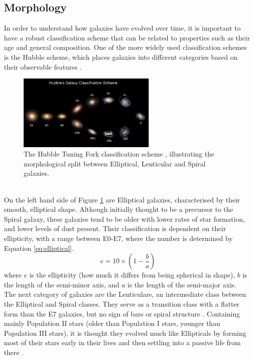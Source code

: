 \documentclass[12pt, onecolumn]{aa}
\begin{document}
\subsection{Morphology}\label{sec:morph}
In order to understand how galaxies have evolved over time, it is important to have a robust classification scheme that can be related to properties such as their age and general composition. One of the more widely used classification schemes is the Hubble scheme, which places galaxies into different categories based on their observable features \citep{1926ApJ....64..321H}. 
\begin{figure}
    \centering
    \includegraphics[width=0.6\textwidth]{Figures/HubbleTuningFork2w.jpg}
    \caption{The Hubble Tuning Fork classification scheme \citep{hubblegzdiagram}, illustrating the morphological split between Elliptical, Lenticular and Spiral galaxies.}
    \label{fig:htuningdiagram}
\end{figure}\\

On the left hand side of Figure \ref{fig:htuningdiagram} are Elliptical galaxies, characterised by their smooth, elliptical shape. Although initially thought to be a precursor to the Spiral galaxy, these galaxies tend to be older \citep{SANDAGEMountWilson} with lower rates of star formation, and lower levels of dust present. Their classification is dependent on their ellipticity, with a range between E0-E7, where the number is determined by Equation \ref{eq:elliptical}.
\begin{equation}
    e = 10 \times (1 - \frac{b}{a})
    \label{eq:elliptical}
\end{equation}
where $e$ is the ellipticity (how much it differs from being spherical in shape), $b$ is the length of the semi-minor axis, and $a$ is the length of the semi-major axis.\\

The next category of galaxies are the Lenticulars, an intermediate class between the Elliptical and Spiral classes. They serve as a transition class with a flatter form than the E7 galaxies, but no sign of bars or spiral structure \citep{SANDAGEMountWilson}. Containing mainly Population II stars (older than Population I stars, younger than Population III stars), it is thought they evolved much like Ellipticals by forming most of their stars early in their lives and then settling into a passive life from there \citep{GribbinJohn2008Gavs}. \\
\end{document}
